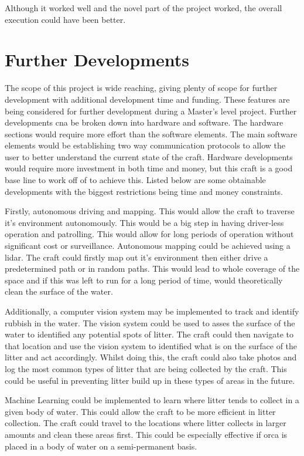 \documentclass [11pt]{article}
\begin{document}
Although it worked well and the novel part of the project worked, the overall execution could have been better. 

\section{Further Developments}
The scope of this project is wide reaching, giving plenty of scope for further development with additional development time and funding. These features are being considered for further development during a Master's level project. Further developments cna be broken down into hardware and software. The hardware sections would require more effort than the software elements. The main software elements would be establishing two way communication protocols to allow the user to better understand the current state of the craft. Hardware developments would require more investment in both time and money, but this craft is a good base line to work off of to achieve this. Listed below are some obtainable developments with the biggest restrictions being time and money constraints.

Firstly, autonomous driving and mapping. This would allow the craft to traverse it's environment autonomously. This would be a big step in having driver-less operation and patrolling. This would allow for long periods of operation without significant cost or surveillance. Autonomous mapping could be achieved using a \gls{lidar}. The craft could firstly map out it's environment then either drive a predetermined path or in random paths. This would lead to whole coverage of the space and if this was left to run for a long period of time, would theoretically clean the surface of the water. 

Additionally, a computer vision system may be implemented to track and identify rubbish in the water. The vision system could be used to asses the surface of the water to identified any potential spots of litter. The craft could then navigate to that location and use the vision system to identified what is on the surface of the litter and act accordingly. Whilst doing this, the craft could also take photos and log the most common types of litter that are being collected by the craft. This could be useful in preventing litter build up in these types of areas in the future.  

Machine Learning could be implemented to learn where litter tends to collect in a given body of water. This could allow the craft to be more efficient in litter collection. The craft could travel to the locations where litter collects in larger amounts and clean these areas first. This could be especially effective if \gls{orca} is placed in a body of water on a semi-permanent basis. 
\end{document}
